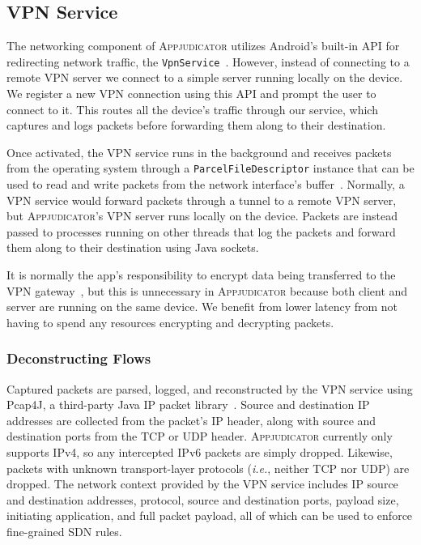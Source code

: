\subsection{VPN Service}
\label{sec:implementation-vpn-service}

The networking component of \textsc{Appjudicator} utilizes Android's built-in
API for redirecting network traffic, the
\texttt{VpnService}~\cite{googledevelopers2020vpn}. However, instead of
connecting to a remote VPN server we connect to a simple server running locally
on the device. We register a new VPN connection using this API and prompt the
user to connect to it. This routes all the device's traffic through our service,
which captures and logs packets before forwarding them along to their
destination.

Once activated, the VPN service runs in the background and receives packets from
the operating system through a \texttt{ParcelFileDescriptor} instance that can
be used to read and write packets from the network interface's
buffer~\cite{vpnguide}.  Normally, a VPN service would forward packets through a
tunnel to a remote VPN server, but \textsc{Appjudicator}'s VPN server runs
locally on the device.  Packets are instead passed to processes running on other
threads that log the packets and forward them along to their destination using
Java sockets.

It is normally the app's responsibility to encrypt data being transferred to the
VPN gateway~\cite{vpnguide}, but this is unnecessary in \textsc{Appjudicator}
because both client and server are running on the same device. We benefit from
lower latency from not having to spend any resources encrypting and decrypting
packets.

\subsubsection{Deconstructing Flows}
\label{sec:deconstructing-flows}

Captured packets are parsed, logged, and reconstructed by the VPN service using
Pcap4J, a third-party Java IP packet library~\cite{kaito2016}. Source and
destination IP addresses are collected from the packet's IP header, along with
source and destination ports from the TCP or UDP header. \textsc{Appjudicator}
currently only supports IPv4, so any intercepted IPv6 packets are simply
dropped. Likewise, packets with unknown transport-layer protocols
(\textit{i.e.}, neither TCP nor UDP) are dropped. The network context provided
by the VPN service includes IP source and destination addresses, protocol,
source and destination ports, payload size, initiating application, and full
packet payload, all of which can be used to enforce fine-grained SDN rules.

